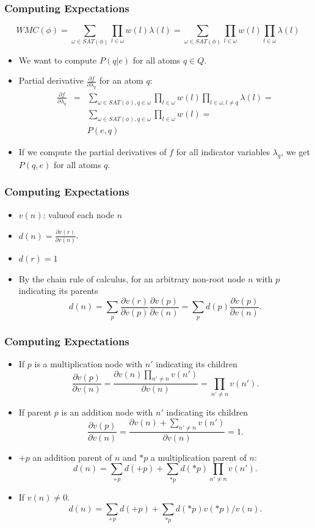 \documentclass[trans,aspectratio=1610]{beamer}
\newcommand\WMC{\mathit{WMC}}
\begin{document}
\begin{frame}
 \frametitle{Computing Expectations}
$$\WMC(\phi)=\sum_{\omega\in SAT(\phi)}\prod_{l\in \omega}w(l)\lambda(l)=\sum_{\omega\in SAT(\phi)}\prod_{l\in \omega}w(l)\prod_{l\in \omega}\lambda(l)$$
\begin{itemize}
\item
We want to compute 
$P(q|e)$ for all atoms $q\in Q$. 
\item Partial derivative $\frac{\partial f}{\partial \lambda_q}$ for an atom $q$:
\begin{eqnarray*}
\frac{\partial f}{\partial \lambda_q}&=&\sum_{\omega\in SAT(\phi),q\in\omega}\prod_{l\in \omega}w(l)\prod_{l\in \omega,l\neq q}\lambda(l)=\\
&&\sum_{\omega\in SAT(\phi),q\in\omega}\prod_{l\in \omega}w(l)=\\
&&P(e,q)
\end{eqnarray*}
\item If we compute the partial derivatives of $f$ for all indicator variables $\lambda_q$,  we get $P(q,e)$ for all atoms $q$.
\end{itemize}
\end{frame}
\begin{frame}
 \frametitle{Computing Expectations}
 \begin{itemize}
\item  $v(n)$: valueof each
node $n$ 
\item 
$d(n)=\frac{\partial v(r)}{\partial v(n)}$.
\item $d(r)=1$ 
\item By the chain rule of calculus, for an
arbitrary non-root node $n$ with  $p$ indicating its parents
$$d(n)=\sum_{p}\frac{\partial v(r)}{\partial v(p)}\frac{\partial v(p)}{\partial v(n)}=\sum_{p}d(p)\frac{\partial v(p)}{\partial v(n)}.$$
\end{itemize}
\end{frame}
\begin{frame}
 \frametitle{Computing Expectations}
 \begin{itemize}
\item 
If  $p$ is a multiplication node with $n'$ indicating its children
$$\frac{\partial v(p)}{\partial v(n)}=\frac{\partial v(n)\prod_{n'\neq n} v(n')}{\partial v(n)}=\prod_{n'\neq n} v(n').$$
\item 
If parent $p$ is an addition node with $n'$ indicating its children
$$\frac{\partial v(p)}{\partial v(n)}=\frac{\partial v(n)+\sum_{n'\neq n} v(n')}{\partial v(n)}=1.$$
\item  $+p$ an addition parent of $n$ and  $*p$ a multiplication parent of $n$:
$$d(n)=\sum_{+p}d(+p)+\sum_{*p}d(*p)\prod_{n'\neq n} v(n').$$
\item
If $v(n)\neq 0$. 
 $$d(n)=\sum_{+p}d(+p)+\sum_{*p}d(*p)v(*p)/v(n).$$
\end{itemize}
\end{frame}
\end{document}
